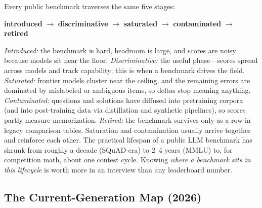 \begin{keyinsight}
Every public benchmark traverses the same five stages:
\begin{center}
\textbf{introduced} $\to$ \textbf{discriminative} $\to$ \textbf{saturated}
$\to$ \textbf{contaminated} $\to$ \textbf{retired}
\end{center}
\emph{Introduced:} the benchmark is hard, headroom is large, and scores are
noisy because models sit near the floor.  \emph{Discriminative:} the useful
phase---scores spread across models and track capability; this is when a
benchmark drives the field.  \emph{Saturated:} frontier models cluster near
the ceiling, and the remaining errors are dominated by mislabeled or ambiguous
items, so deltas stop meaning anything.  \emph{Contaminated:} questions and
solutions have diffused into pretraining corpora (and into post-training data
via distillation and synthetic pipelines), so scores partly measure
memorization.  \emph{Retired:} the benchmark survives only as a row in legacy
comparison tables.  Saturation and contamination usually arrive together and
reinforce each other.  The practical lifespan of a public LLM benchmark has
shrunk from roughly a decade (SQuAD-era) to 2--4 years (MMLU) to, for
competition math, about one contest cycle.  Knowing \emph{where a benchmark
sits in this lifecycle} is worth more in an interview than any leaderboard
number.
\end{keyinsight}

\subsection{The Current-Generation Map (2026)}
\label{sec:benchmark_map}

